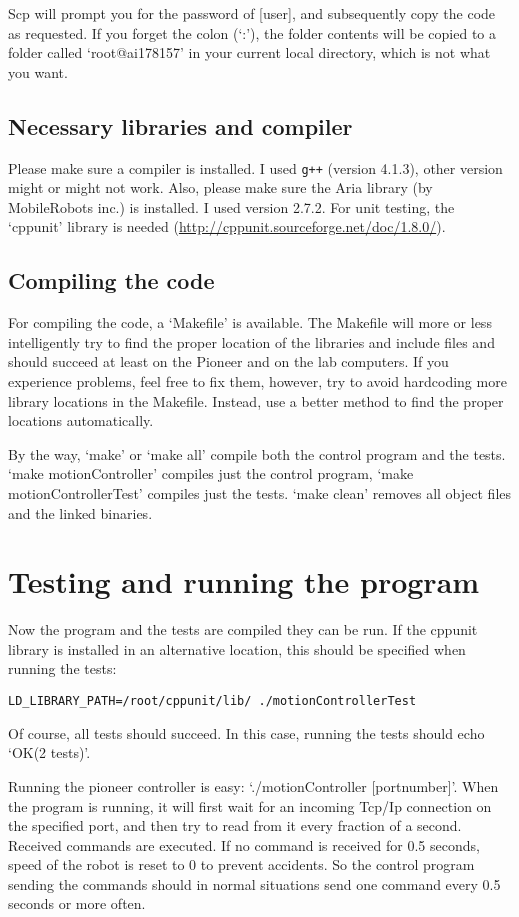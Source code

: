 \documentclass[a4paper, 12pt, oneside]{report}
\begin{document}
Scp will prompt you for the password of [user], and subsequently copy the code
as requested. If you forget the colon (`:'), the folder contents will be copied
to a folder called `root@ai178157' in your current local directory, which is not
what you want.

\subsection{Necessary libraries and compiler}
Please make sure a compiler is installed. I used \verb=g++= (version 4.1.3),
other version might or might not work. Also, please make sure the Aria library
(by MobileRobots inc.) is installed. I used version 2.7.2. For unit testing, the
`cppunit' library is needed (\url{http://cppunit.sourceforge.net/doc/1.8.0/}).

\subsection{Compiling the code}
For compiling the code, a `Makefile' is available. The Makefile will more or
less intelligently try to find the proper location of the libraries and include
files and should succeed at least on the Pioneer and on the lab computers. If
you experience problems, feel free to fix them, however, try to avoid hardcoding
more library locations in the Makefile. Instead, use a better method to find the
proper locations automatically.

By the way, `make' or `make all' compile both the control program and the tests.
`make motionController' compiles just the control program, `make
motionControllerTest' compiles just the tests. `make clean' removes all object
files and the linked binaries.

\section{Testing and running the program}
Now the program and the tests are compiled they can be run. If the cppunit
library is installed in an alternative location, this should be specified when
running the tests: 

\begin{verbatim}
LD_LIBRARY_PATH=/root/cppunit/lib/ ./motionControllerTest
\end{verbatim}

Of course, all tests should succeed. In this case, running the tests should echo
`OK(2 tests)'.

Running the pioneer controller is easy: `./motionController [portnumber]'. When
the program is running, it will first wait for an incoming Tcp/Ip connection on
the specified port, and then try to read from it every fraction of a second.
Received commands are executed. If no command is received for 0.5 seconds, speed
of the robot is reset to 0 to prevent accidents. So the control program sending
the commands should in normal situations send one command every 0.5 seconds or
more often.
\end{document}
